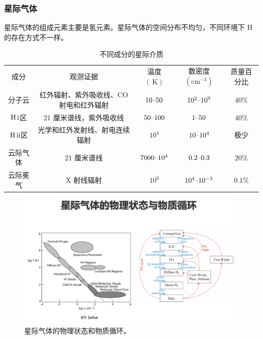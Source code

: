 \documentclass[../天体物理基础.tex]{subfiles}
\begin{document}
\subsubsection{星际气体}
星际气体的组成元素主要是氢元素。星际气体的空间分布不均匀，不同环境下 H 的存在方式不一样。
\begin{table}[!htbp]
\centering
\caption{不同成分的星际介质}
\begin{tabular}{c c c c c}
\hline
成分 & 观测证据 & 温度 $\left(\,\mathrm{K}\right)$ & 数密度$\left(\mathrm{cm^{-3}}\right)$ & 质量百分比\\
\cline{1-5}
分子云 & 红外辐射、紫外吸收线、$\mathrm{CO}$射电和红外辐射 & $10\text{\textendash}50$ & $10^{2}\text{\textendash}10^{9}$ & $40\%$\\
\cline{1-5}
$\mathrm{H\,\uppercase\expandafter{\romannumeral1}}$区 & 21 厘米谱线，紫外吸收线 & $50\text{\textendash}100$ & $1\text{\textendash}50$ & $40\%$\\
\cline{1-5}
$\mathrm{H\,\uppercase\expandafter{\romannumeral2}}$区 & 光学和红外发射线、射电连续辐射 & $10^{4}$ & $10\text{\textendash}10^{4}$ & 极少\\
\cline{1-5}
云际气体 & 21 厘米谱线 & $7000\text{\textendash}10^{4}$ & $0.2\text{\textendash}0.3$ & $20\%$\\
\cline{1-5}
云际冕气 & X 射线辐射 & $10^{6}$ & $10^{4}\text{\textendash}10^{-3}$ & $0.1\%$\\
\hline
\end{tabular}
\label{}
\end{table}

\begin{figure}[!htbp]
\centering
\includegraphics[width=11cm]{figures/figure3_1.png}
\captionsetup{justification=raggedright, singlelinecheck=false}
\caption{星际气体的物理状态和物质循环。}
\label{星际气体的物理状态和物质循环。}
\end{figure}
\end{document}
